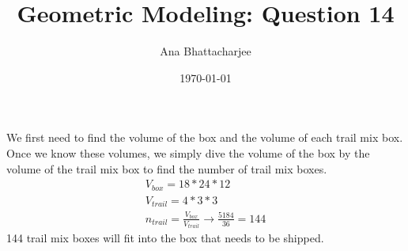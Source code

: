\documentclass{article}
\begin{document}
\title{Geometric Modeling: Question 14}
\author{Ana Bhattacharjee}
\date{\today}

\begin{center}
We first need to find the volume of the box and the volume of each trail mix box. Once we know these volumes, we simply dive the volume of the box by the volume of the trail mix box to find the number of trail mix boxes.
\begin{align}
  V_{box} = 18 * 24 * 12 \\
  V_{trail} = 4 * 3 * 3 \\
  n_{trail} = \frac{V_{box}}{V_{trail}} \rightarrow \frac{5184}{36} = 144
\end{align}
144 trail mix boxes will fit into the box that needs to be shipped.
\end{center}
\end{document}
